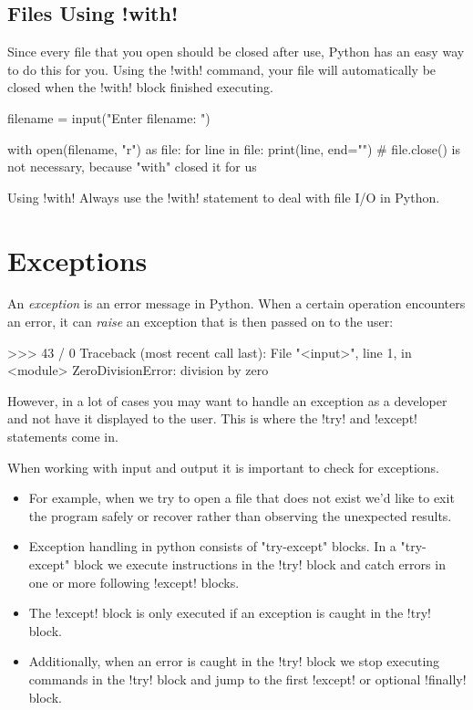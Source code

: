 \documentclass[11pt]{cselabheader}
\begin{document}
\subsection{Files Using \protect\pythoninline!with!}
\label{sec:with}

Since every file that you open should be closed after use, Python has an easy
way to do this for you. Using the \pythoninline!with! command, your file will
automatically be closed when the \pythoninline!with! block finished executing.

\begin{python3code}
filename = input("Enter filename: ")

with open(filename, "r") as file:
    for line in file:
        print(line, end="")
# file.close() is not necessary, because "with" closed it for us
\end{python3code}

\begin{warningbox}{Using \protect\pythoninline!with!}
  Always use the \pythoninline!with! statement to deal with file I/O in Python.
\end{warningbox}

\pagebreak
\section{Exceptions}

An \emph{exception} is an error message in Python. When a certain operation
encounters an error, it can \emph{raise} an exception that is then passed on to
the user:

\begin{pyconcode}
>>> 43 / 0
Traceback (most recent call last):
  File "<input>", line 1, in <module>
ZeroDivisionError: division by zero
\end{pyconcode}

However, in a lot of cases you may want to handle an exception as a developer
and not have it displayed to the user. This is where the \pythoninline!try! and
\pythoninline!except! statements come in.

When working with input and output it is important to check for exceptions.  
\begin{itemize}
  \item For example, when we try to open a file that does not exist we'd like to
    exit the program safely or recover rather than observing the unexpected
    results.
  \item Exception handling in python consists of "try-except" blocks.  In a
    "try-except" block we execute instructions in the \pythoninline!try! block
    and catch errors in one or more following \pythoninline!except! blocks.  
  \item The \pythoninline!except! block is only executed if an exception is
    caught in the \pythoninline!try! block.
  \item Additionally, when an error is
    caught in the \pythoninline!try! block we stop executing commands in the
    \pythoninline!try!  block and jump to the first \pythoninline!except! or
    optional \pythoninline!finally! block.
\end{itemize}
\end{document}
